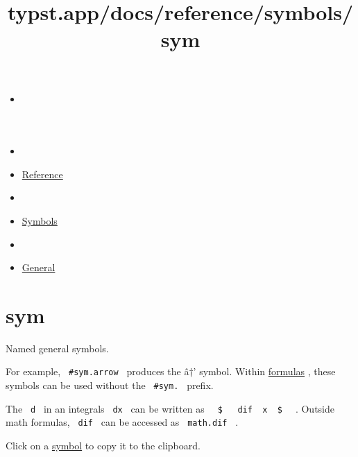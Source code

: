 \title{typst.app/docs/reference/symbols/sym}

\begin{itemize}
\tightlist
\item
  \href{/docs}{}
\item
  
\item
  \href{/docs/reference/}{Reference}
\item
  
\item
  \href{/docs/reference/symbols/}{Symbols}
\item
  
\item
  \href{/docs/reference/symbols/sym/}{General}
\end{itemize}

\section{sym}\label{sym}

Named general symbols.

For example, \texttt{\ \#sym.arrow\ } produces the â†' symbol. Within
\href{/docs/reference/math/}{formulas} , these symbols can be used
without the \texttt{\ \#sym.\ } prefix.

The \texttt{\ d\ } in an integral\textquotesingle s \texttt{\ dx\ } can
be written as
\texttt{\ }{\texttt{\ \$\ }}\texttt{\ }{\texttt{\ dif\ }}\texttt{\ x\ }{\texttt{\ \$\ }}\texttt{\ }
. Outside math formulas, \texttt{\ dif\ } can be accessed as
\texttt{\ math.dif\ } .

Click on a \href{/docs/reference/symbols/symbol/}{symbol} to copy it to
the clipboard.




